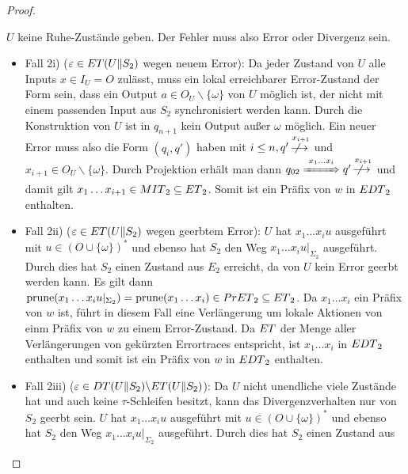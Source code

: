\begin{proof}
\begin{itemize}
      $U$ keine Ruhe-Zustände geben. Der Fehler muss also Error oder Divergenz
      sein.
      \begin{itemize}
        \item Fall 2i) ($\varepsilon\in ET{}(U\|S_2)$ wegen neuem Error): Da
          jeder Zustand von $U$ alle Inputs $x\in I_U=O$ zulässt, muss ein
          lokal erreichbarer Error-Zustand der Form sein, dass ein Output $a\in
          O_U\backslash\{\omega\}$ von $U$ möglich ist, der nicht mit einem
          passenden Input aus $S_2$ synchronisiert werden kann. Durch die
          Konstruktion von $U$ ist in $q_{n+1}$ kein Output außer $\omega$
          möglich. Ein neuer Error muss also die Form $(q_i,q')$ haben mit
          $i\leq n, q' \overset{x_{i+1}}{\not{\hspace{-0.2cm}\longrightarrow}}$ und
          $x_{i+1}\in O_U\backslash\{\omega\}$. Durch Projektion erhält man
          dann $q_{02} \overset{x_1\dots x_i}{\xRightarrow{\hspace{0.9cm}}} q'
          \overset{x_{i+1}}{\not{\hspace{-0.2cm}\longrightarrow}}$ und damit gilt
          $x_1\dots x_{i+1}\in MIT{}_2\subseteq ET{}_2$. Somit ist ein Präfix
          von $w$ in $EDT{}_2$ enthalten.
        \item Fall 2ii) ($\varepsilon\in ET{}(U\|S_2)$ wegen geerbtem Error):
          $U$ hat $x_1\dots x_iu$ ausgeführt mit $u\in (O\cup\{\omega\})^*$ und
          ebenso hat $S_2$ den Weg $x_1\dots x_iu|_{\Sigma _2}$ ausgeführt.
          Durch dies hat $S_2$ einen Zustand aus $E_2$ erreicht, da von $U$
          kein Error geerbt werden kann. Es gilt dann $\mathrm{prune}{}(x_1\dots
          x_iu|_{\Sigma _2})= \mathrm{prune}{}(x_1\dots x_i)\in PrET{}_2\subseteq
          ET{}_2$. Da $x_1\dots x_i$ ein Präfix von $w$ ist, führt in diesem
          Fall eine Verlängerung um lokale Aktionen von einm
          Präfix von $w$ zu einem Error-Zustand. Da $ET$ der Menge aller
          Verlängerungen von gekürzten Errortraces entspricht, ist $x_1\dots x_i$ in
          $EDT{}_2$ enthalten und somit ist ein Präfix von $w$ in $EDT{}_2$
          enthalten.
        \item Fall 2iii) ($\varepsilon\in DT{}(U\|S_2)\backslash
          ET{}(U\|S_2)$): Da $U$ nicht unendliche viele Zustände hat und auch
          keine $\tau$-Schleifen besitzt, kann das Divergenzverhalten nur von
          $S_2$ geerbt sein. $U$ hat $x_1\dots x_iu$ ausgeführt mit $u\in
          (O\cup \{\omega\})^*$ und ebenso hat $S_2$ den Weg $x_1\dots
          x_iu|_{\Sigma _2}$ ausgeführt. Durch dies hat $S_2$ einen Zustand aus

\end{itemize}
\end{itemize}
\end{proof}
